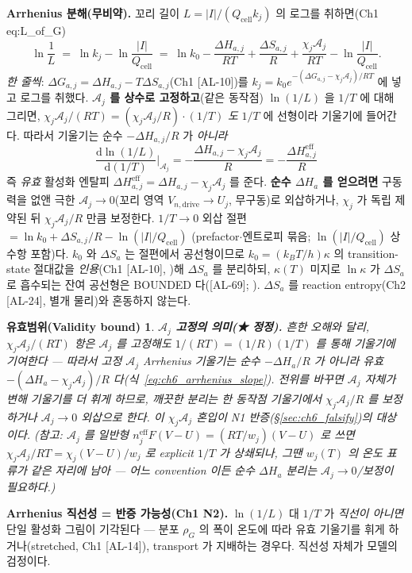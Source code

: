 \documentclass[11pt,a4paper]{article}
\newtheorem*{boundbox}{유효범위(Validity bound)}
\newcommand{\dd}{\mathrm{d}}
\newcommand{\eff}{\mathrm{eff}}
\newcommand{\drive}{\mathrm{drive}}
\newcommand{\cell}{\mathrm{cell}}
\newcommand{\AL}[1]{\textsf{[AL-#1]}}
\begin{document}
\textbf{Arrhenius 분해(무비약).} 꼬리 길이 $L=|I|/(Q_\cell k_j)$ 의 로그를 취하면(Ch1 eq:L\_of\_G)
\begin{equation}
\ln\frac1L\;=\;\ln k_j-\ln\frac{|I|}{Q_\cell}\;=\;\ln k_0-\frac{\Delta H_{a,j}}{RT}+\frac{\Delta S_{a,j}}{R}
+\frac{\chi_j\mathcal A_j}{RT}-\ln\frac{|I|}{Q_\cell}.
\label{eq:ch6_arrhenius}
\end{equation}
\emph{한 줄씩}: $\Delta G_{a,j}=\Delta H_{a,j}-T\Delta S_{a,j}$(Ch1 \AL{10})를 $k_j=k_0 e^{-(\Delta G_{a,j}-\chi_j
\mathcal A_j)/RT}$ 에 넣고 로그를 취했다. \textbf{$\mathcal A_j$ 를 상수로 고정하고}(같은 동작점) $\ln(1/L)$ 을 $1/T$ 에
대해 그리면, $\chi_j\mathcal A_j/(RT)=(\chi_j\mathcal A_j/R)\cdot(1/T)$ \emph{도} $1/T$ 에 선형이라 기울기에 들어간다.
따라서 기울기는 순수 $-\Delta H_{a,j}/R$ 가 \emph{아니라}
\begin{equation}
\frac{\dd\ln(1/L)}{\dd(1/T)}\Big|_{\mathcal A_j}=-\frac{\Delta H_{a,j}-\chi_j\mathcal A_j}{R}=-\frac{\Delta H_{a,j}^{\eff}}{R}
\label{eq:ch6_arrhenius_slope}
\end{equation}
즉 \emph{유효} 활성화 엔탈피 $\Delta H_{a,j}^{\eff}=\Delta H_{a,j}-\chi_j\mathcal A_j$ 를 준다. \textbf{순수 $\Delta H_a$ 를
얻으려면} 구동력을 없앤 극한 $\mathcal A_j\to0$(꼬리 영역 $V_{n,\drive}\to U_j$, 무구동)로 외삽하거나, $\chi_j$ 가 독립
제약된 뒤 $\chi_j\mathcal A_j/R$ 만큼 보정한다. $1/T\to0$ 외삽 절편 $=\ln k_0+\Delta S_{a,j}/R-\ln(|I|/Q_\cell)$
(prefactor$\cdot$엔트로피 묶음; $\ln(|I|/Q_\cell)$ 상수항 포함)다. $k_0$ 와 $\Delta S_a$ 는 절편에서 공선형이므로
$k_0=(k_BT/h)\kappa$ 의 transition-state 절대값을 \emph{인용}(Ch1 \AL{10}, \cite{eyring1935})해 $\Delta S_a$ 를
분리하되, $\kappa(T)$ 미지로 $\ln\kappa$ 가 $\Delta S_a$ 로 흡수되는 잔여 공선형은 BOUNDED 다(\AL{69};
\cite{bardfaulkner}). $\Delta S_a$ 를 reaction entropy(Ch2 \AL{24}, 별개 물리)와 혼동하지 않는다.
\begin{boundbox}
\textbf{$\mathcal A_j$ 고정의 의미(★ 정정).} 흔한 오해와 달리, $\chi_j\mathcal A_j/(RT)$ 항은 $\mathcal A_j$ 를
\emph{고정해도} $1/(RT)=(1/R)(1/T)$ 를 통해 기울기에 기여한다 — 따라서 고정 $\mathcal A_j$ Arrhenius 기울기는 순수
$-\Delta H_a/R$ 가 아니라 \emph{유효} $-(\Delta H_a-\chi_j\mathcal A_j)/R$ 다(식~\eqref{eq:ch6_arrhenius_slope}).
전위를 \emph{바꾸면} $\mathcal A_j$ 자체가 변해 기울기를 더 휘게 하므로, 깨끗한 분리는 한 동작점 기울기에서
$\chi_j\mathcal A_j/R$ 를 보정하거나 $\mathcal A_j\to0$ 외삽으로 한다. 이 $\chi_j\mathcal A_j$ 혼입이 N1
반증(\S\ref{sec:ch6_falsify})의 대상이다. (참고: $\mathcal A_j$ 를 일반형 $n_j^\eff F(V-U)=(RT/w_j)(V-U)$ 로 쓰면
$\chi_j\mathcal A_j/RT=\chi_j(V-U)/w_j$ 로 explicit $1/T$ 가 상쇄되나, 그땐 $w_j(T)$ 의 온도 표류가 같은 자리에 남아
— 어느 convention 이든 순수 $\Delta H_a$ 분리는 $\mathcal A_j\to0$/보정이 필요하다.)
\end{boundbox}
\textbf{Arrhenius 직선성 = 반증 가능성(Ch1 N2).} $\ln(1/L)$ 대 $1/T$ 가 \emph{직선이 아니면} 단일 활성화 그림이
기각된다 — 분포 $\rho_G$ 의 폭이 온도에 따라 유효 기울기를 휘게 하거나(stretched, Ch1 \AL{14}), transport 가
지배하는 경우다. 직선성 자체가 모델의 검정이다.
\end{document}
